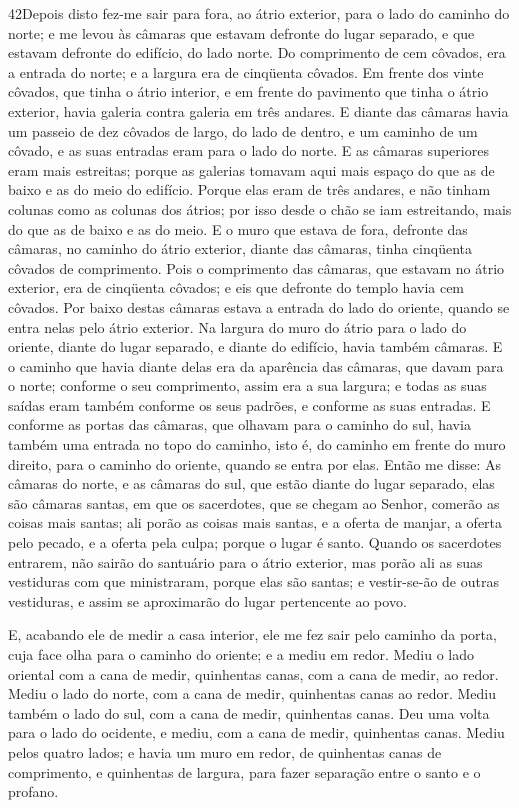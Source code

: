 \lettrine{42} Depois disto fez-me sair para fora, ao átrio
exterior, para o lado do caminho do norte; e me levou às câmaras que
estavam defronte do lugar separado, e que estavam defronte do
edifício, do lado norte. Do comprimento de cem côvados, era a
entrada do norte; e a largura era de cinqüenta côvados. Em
frente dos vinte côvados, que tinha o átrio interior, e em frente do
pavimento que tinha o átrio exterior, havia galeria contra galeria
em três andares. E diante das câmaras havia um passeio de dez
côvados de largo, do lado de dentro, e um caminho de um côvado, e as
suas entradas eram para o lado do norte. E as câmaras superiores
eram mais estreitas; porque as galerias tomavam aqui mais espaço do
que as de baixo e as do meio do edifício. Porque elas eram de
três andares, e não tinham colunas como as colunas dos átrios; por
isso desde o chão se iam estreitando, mais do que as de baixo e as
do meio. E o muro que estava de fora, defronte das câmaras, no
caminho do átrio exterior, diante das câmaras, tinha cinqüenta
côvados de comprimento. Pois o comprimento das câmaras, que
estavam no átrio exterior, era de cinqüenta côvados; e eis que
defronte do templo havia cem côvados. Por baixo destas câmaras
estava a entrada do lado do oriente, quando se entra nelas pelo
átrio exterior. Na largura do muro do átrio para o lado do
oriente, diante do lugar separado, e diante do edifício, havia
também câmaras. E o caminho que havia diante delas era da
aparência das câmaras, que davam para o norte; conforme o seu
comprimento, assim era a sua largura; e todas as suas saídas eram
também conforme os seus padrões, e conforme as suas entradas.
E conforme as portas das câmaras, que olhavam para o caminho
do sul, havia também uma entrada no topo do caminho, isto é, do
caminho em frente do muro direito, para o caminho do oriente, quando
se entra por elas. Então me disse: As câmaras do norte, e as
câmaras do sul, que estão diante do lugar separado, elas são câmaras
santas, em que os sacerdotes, que se chegam ao Senhor, comerão as
coisas mais santas; ali porão as coisas mais santas, e a oferta de
manjar, a oferta pelo pecado, e a oferta pela culpa; porque o lugar
é santo. Quando os sacerdotes entrarem, não sairão do
santuário para o átrio exterior, mas porão ali as suas vestiduras
com que ministraram, porque elas são santas; e vestir-se-ão de
outras vestiduras, e assim se aproximarão do lugar pertencente ao
povo.

E, acabando ele de medir a casa interior, ele me fez sair pelo
caminho da porta, cuja face olha para o caminho do oriente; e a
mediu em redor. Mediu o lado oriental com a cana de medir,
quinhentas canas, com a cana de medir, ao redor. Mediu o lado
do norte, com a cana de medir, quinhentas canas ao redor.
Mediu também o lado do sul, com a cana de medir, quinhentas
canas. Deu uma volta para o lado do ocidente, e mediu, com a
cana de medir, quinhentas canas. Mediu pelos quatro lados; e
havia um muro em redor, de quinhentas canas de comprimento, e
quinhentas de largura, para fazer separação entre o santo e o
profano.


